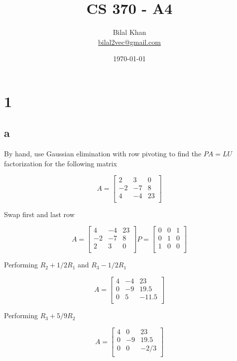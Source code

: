 \documentclass[11pt]{article}
\title{CS 370 - A4}
\author{Bilal Khan\\
\href{mailto:bilal2vec@gmail.com}{bilal2vec@gmail.com}}
\date{\today}
\begin{document}
\maketitle

\tableofcontents

\section{1}

\subsection{a}

By hand, use Gaussian elimination with row pivoting to find the $PA = LU$ factorization for the following matrix

\[
A = \begin{bmatrix}
  2 & 3 & 0 \\
  -2 & -7 & 8 \\
  4 & -4 & 23 \\
\end{bmatrix}
\]

Swap first and last row

\[
  A = \begin{bmatrix}
    4 & -4 & 23 \\
    -2 & -7 & 8 \\
    2 & 3 & 0 \\
  \end{bmatrix}
  P = \begin{bmatrix}
    0 & 0 & 1 \\
    0 & 1 & 0 \\
    1 & 0 & 0 \\
  \end{bmatrix}
\]

Performing $R_2 + 1/2 R_1$ and $R_3 - 1/2 R_1$

\[A = \begin{bmatrix}
  4 & -4 & 23 \\
  0 & -9 & 19.5 \\
  0 & 5 & -11.5 \\
\end{bmatrix}\]

Performing $R_3 + 5/9 R_2$

\[A = \begin{bmatrix}
  4 & 0 & 23 \\
  0 & -9 & 19.5 \\
  0 & 0 & -2/3 \\
\end{bmatrix}
\]
\end{document}
